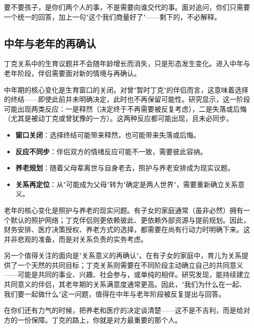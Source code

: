 \documentclass[12pt,UTF8]{ctexbook}
\newcommand{\keyword}[1]{\textbf{#1}}
\begin{document}
\begin{tcolorbox}[colback=pink!5!white,colframe=red!50!black,title=贴心小叮咛]
	要不要孩子，是你们两个人的事，不是需要向谁交代的事。面对追问，你们只需要一个统一的回答，加上一句"这个我们商量好了"——剩下的，不必解释。
\end{tcolorbox}
\subsection{中年与老年的再确认}

丁克关系中的生育议题并不会随年龄增长而消失，只是形态发生变化。进入中年与老年阶段，伴侣需要面对新的情境与再确认。

中年期的核心变化是生育窗口的关闭。对曾"暂时丁克"的伴侣而言，这意味着选择的终结——即使此前并未明确决定，此时也不再保留可能性。研究显示，这一阶段可能出现两类反应：一是释然（决定终于不再需要被反复考虑），二是失落或后悔（尤其是被动丁克或曾犹豫的一方）。这两种反应都可能出现，且未必同步。

\begin{itemize}
	\item \keyword{窗口关闭}：选择终结可能带来释然，也可能带来失落或后悔。
	\item \keyword{反应不同步}：伴侣双方的情绪反应可能不一致，需要彼此容纳。
	\item \keyword{养老规划}：随着父母辈离世与自身老去，照护与养老安排成为现实议题。
	\item \keyword{关系再定位}：从"可能成为父母"转为"确定是两人世界"，需要重新确立关系意义。
\end{itemize}

老年的核心变化是照护与养老的现实问题。有子女的家庭通常（虽非必然）拥有一个默认的照护网络；丁克伴侣则更依赖彼此、更依赖外部资源与提前规划。因此，财务安排、医疗决策授权、养老方式的选择，都需要在尚有行动力时明确下来。这并非悲观的准备，而是对关系负责的实务考虑。

另一个值得关注的面向是"关系意义的再确认"。在有子女的家庭中，育儿为关系提供了一个天然的共同目标；丁克关系则需要在不同阶段主动确立自己的共同意义——可能是共同的事业、兴趣、社会参与，或单纯的相伴。研究发现，能持续建立共同意义的伴侣，其老年期的关系满意度通常更高。因此，"我们为什么在一起、我们要一起做什么"这一问题，值得在中年与老年阶段被反复提出与回答。

\begin{tcolorbox}[colback=pink!5!white,colframe=red!50!black,title=贴心小叮咛]
	在你们还有力气的时候，把养老和医疗的决定谈清楚——这不是不吉利，而是给对方的一份保障。丁克的路上，你就是对方最重要的那个人。
\end{tcolorbox}
\end{document}

